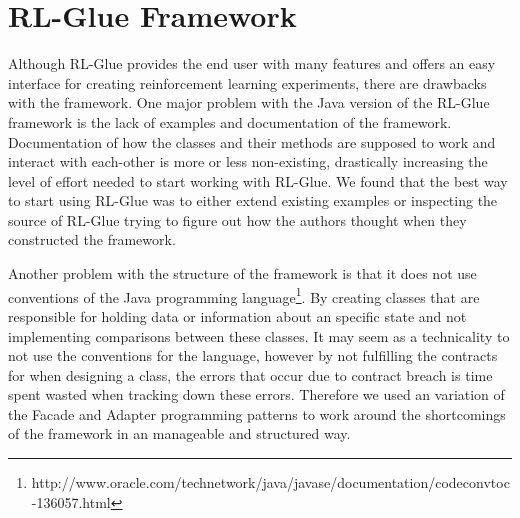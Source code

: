 \section{RL-Glue Framework}
\label{ap:eval_glue}
Although RL-Glue provides the end user with many features and offers an easy interface for creating reinforcement learning experiments, there are drawbacks with the framework. One major problem with the Java version of the RL-Glue framework is the lack of examples and documentation of the framework. Documentation of how the classes and their methods are supposed to work and interact with each-other is more or less non-existing, drastically increasing the level of effort needed to start working with RL-Glue. We found that the best way to start using RL-Glue was to either extend existing examples or inspecting the source of RL-Glue trying to figure out how the authors thought when they constructed the framework.

Another problem with the structure of the framework is that it does not use conventions of the Java programming language\footnote{http://www.oracle.com/technetwork/java/javase/documentation/codeconvtoc-136057.html}. By creating classes that are responsible for holding data or information about an specific state and not implementing comparisons between these classes. It may seem as a technicality to not use the conventions for the language, however by not fulfilling the contracts for when designing a class, the errors that occur due to contract breach is time spent wasted when tracking down these errors. Therefore we used an variation of the Facade and Adapter programming patterns \parencite{gamme1994designpatterns} to work around the shortcomings of the framework in an manageable and structured way.
